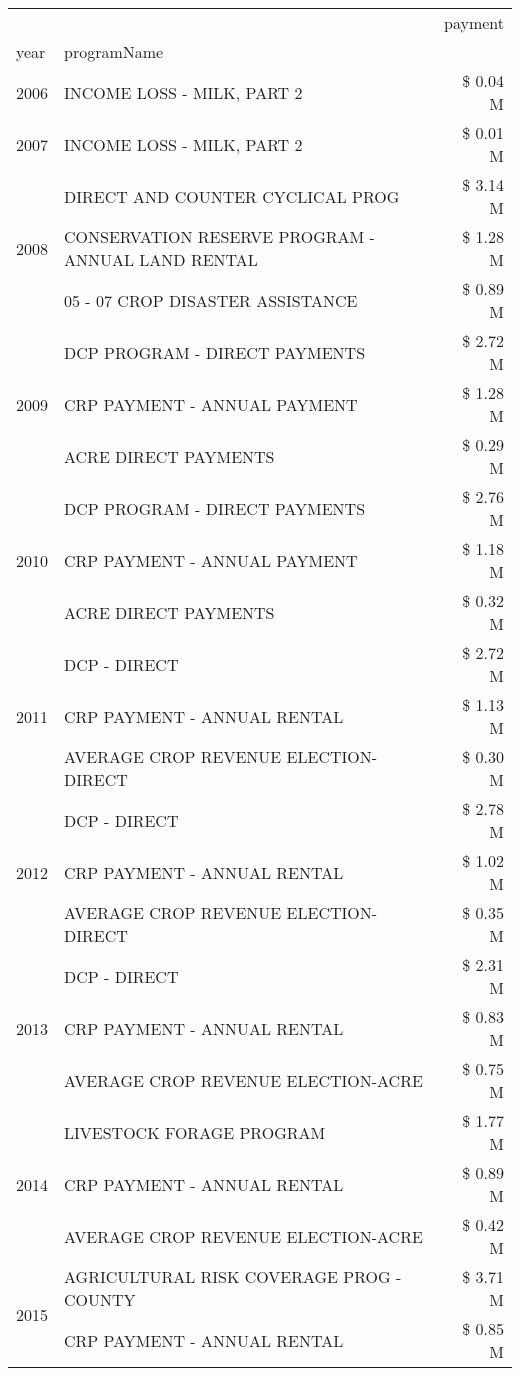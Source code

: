 \begin{tabular}{llr}
\toprule
 &  & payment \\
year & programName &  \\
\midrule
2006 & INCOME LOSS - MILK, PART 2 & \$ 0.04 M \\
\cline{1-3}
2007 & INCOME LOSS - MILK, PART 2 & \$ 0.01 M \\
\cline{1-3}
\multirow[t]{3}{*}{2008} & DIRECT AND COUNTER CYCLICAL PROG & \$ 3.14 M \\
 & CONSERVATION RESERVE PROGRAM - ANNUAL LAND RENTAL & \$ 1.28 M \\
 & 05 - 07 CROP DISASTER ASSISTANCE & \$ 0.89 M \\
\cline{1-3}
\multirow[t]{3}{*}{2009} & DCP PROGRAM - DIRECT PAYMENTS & \$ 2.72 M \\
 & CRP PAYMENT - ANNUAL PAYMENT & \$ 1.28 M \\
 & ACRE DIRECT PAYMENTS & \$ 0.29 M \\
\cline{1-3}
\multirow[t]{3}{*}{2010} & DCP PROGRAM - DIRECT PAYMENTS & \$ 2.76 M \\
 & CRP PAYMENT - ANNUAL PAYMENT & \$ 1.18 M \\
 & ACRE DIRECT PAYMENTS & \$ 0.32 M \\
\cline{1-3}
\multirow[t]{3}{*}{2011} & DCP - DIRECT & \$ 2.72 M \\
 & CRP PAYMENT - ANNUAL RENTAL & \$ 1.13 M \\
 & AVERAGE CROP REVENUE ELECTION-DIRECT & \$ 0.30 M \\
\cline{1-3}
\multirow[t]{3}{*}{2012} & DCP - DIRECT & \$ 2.78 M \\
 & CRP PAYMENT - ANNUAL RENTAL & \$ 1.02 M \\
 & AVERAGE CROP REVENUE ELECTION-DIRECT & \$ 0.35 M \\
\cline{1-3}
\multirow[t]{3}{*}{2013} & DCP - DIRECT & \$ 2.31 M \\
 & CRP PAYMENT - ANNUAL RENTAL & \$ 0.83 M \\
 & AVERAGE CROP REVENUE ELECTION-ACRE & \$ 0.75 M \\
\cline{1-3}
\multirow[t]{3}{*}{2014} & LIVESTOCK FORAGE PROGRAM & \$ 1.77 M \\
 & CRP PAYMENT - ANNUAL RENTAL & \$ 0.89 M \\
 & AVERAGE CROP REVENUE ELECTION-ACRE & \$ 0.42 M \\
\cline{1-3}
\multirow[t]{3}{*}{2015} & AGRICULTURAL RISK COVERAGE PROG - COUNTY & \$ 3.71 M \\
 & CRP PAYMENT - ANNUAL RENTAL & \$ 0.85 M \\

\end{tabular}
